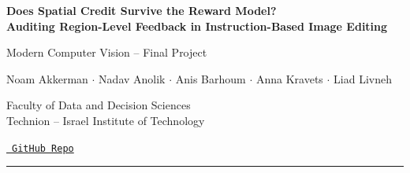 \documentclass[10pt,a4paper]{article}
\begin{document}
\begin{center}

    {\LARGE\bfseries
    Does Spatial Credit Survive the Reward Model?\\
    Auditing Region-Level Feedback in Instruction-Based Image Editing}

    \vspace{4pt}

    {\large\color{accent}
    Modern Computer Vision -- Final Project}

    \vspace{3pt}

    Noam Akkerman \quad $\cdot$ \quad
    Nadav Anolik \quad $\cdot$ \quad
    Anis Barhoum \quad $\cdot$ \quad
    Anna Kravets \quad $\cdot$ \quad
    Liad Livneh

    \vspace{7pt}

    {\small
    Faculty of Data and Decision Sciences\\
    Technion -- Israel Institute of Technology
    }
    \vspace{4pt}
    
    {\small
    \href{https://github.com/nadavanolik/mcv-spatial-audit}
    {\faGithub\ \texttt{GitHub Repo}}
    }

    

\end{center}

\vspace{4pt}
\hrule
\vspace{8pt}


\begin{abstract}

Reinforcement-learning based methods for image editing increasingly reward each region of an edit separately, with scores from a vision-language model (VLM) judge, assuming that the score of a region reflects that region. We test this assumption with a controlled audit: we corrupt exactly one region of an edited image and ask the judge to score every region again. Applying the region-level prompt of SpatialFlow-GRPO to Qwen3-VL-8B and InternVL3-8B on 150 COCO photographs (5,236 variants), we find that while both judges perceive the damage, neither attributes it to the damaged region: the AUROC for singling it out is 0.52--0.54. The scores also depend more on the prompt than on the pixels. The judge receives the regions to score as a list, and showing it the same clean image with that list in a different order changes a region's score 1.6--1.8 times as much as corrupting that region does. These results bring us to believe that contrary to the RL methods' underlying assumption, per-region VLM rewards carry far less spatial information than their form implies.

\end{abstract}
\end{document}
